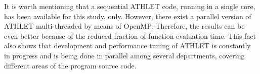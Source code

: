 It is worth mentioning that a sequential ATHLET code, running in a single core, has been available for this study, only. However, there exist a parallel version of ATHLET multi-threaded by means of OpenMP. Therefore, the results can be even better because of the reduced fraction of function evaluation time. This fact also shows that development and performance tuning of ATHLET is constantly in progress and is being done in parallel among several departments, covering different areas of the program source code.\\


